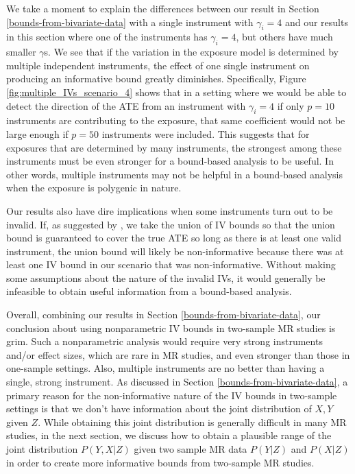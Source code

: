\documentclass[
]{article}
\theoremstyle{plain}
\begin{document}
We take a moment to explain the differences between our result in Section \ref{bounds-from-bivariate-data} with a single instrument with \(\gamma_i = 4\) and our results in this section where one of the instruments has \(\gamma_i = 4\), but others have much smaller \(\gamma\)s. We see that if the variation in the exposure model is determined by multiple independent instruments, the effect of one single instrument on producing an informative bound greatly diminishes. Specifically, Figure \ref{fig:multiple_IVs_scenario_4} shows that in a setting where we would be able to detect the direction of the ATE from an instrument with \(\gamma_i = 4\) if only \(p = 10\) instruments are contributing to the exposure, that same coefficient would not be large enough if \(p = 50\) instruments were included. This suggests that for exposures that are determined by many instruments, the strongest among these instruments must be even stronger for a bound-based analysis to be useful. In other words, multiple instruments may not be helpful in a bound-based analysis when the exposure is polygenic in nature.

Our results also have dire implications when some instruments turn out to be invalid. If, as suggested by \textcite{swanson_commentary_2017}, we take the union of IV bounds so that the union bound is guaranteed to cover the true ATE so long as there is at least one valid instrument, the union bound will likely be non-informative because there was at least one IV bound in our scenario that was non-informative. Without making some assumptions about the nature of the invalid IVs, it would generally be infeasible to obtain useful information from a bound-based analysis.

Overall, combining our results in Section \ref{bounds-from-bivariate-data}, our conclusion about using nonparametric IV bounds in two-sample MR studies is grim. Such a nonparametric analysis would require very strong instruments and/or effect sizes, which are rare in MR studies, and even stronger than those in one-sample settings. Also, multiple instruments are no better than having a single, strong instrument. As discussed in Section \ref{bounds-from-bivariate-data}, a primary reason for the non-informative nature of the IV bounds in two-sample settings is that we don't have information about the joint distribution of \(X,Y\) given \(Z\). While obtaining this joint distribution is generally difficult in many MR studies, in the next section, we discuss how to obtain a plausible range of the joint distribution \(P(Y, X | Z)\) given two sample MR data \(P(Y|Z)\) and \(P(X | Z)\) in order to create more informative bounds from two-sample MR studies.
\end{document}
